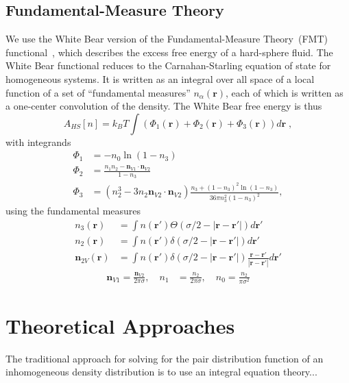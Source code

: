 \documentclass[letterpaper,twocolumn,amsmath,amssymb,pre,aps,10pt]{revtex4-1}
\newcommand{\rr}{\textbf{r}}
\begin{document}
\subsection*{Fundamental-Measure Theory}

We use the White Bear version of the Fundamental-Measure Theory~(FMT)
functional~\cite{roth2002whitebear}, which describes the excess free
energy of a hard-sphere fluid.  The White Bear functional reduces to
the Carnahan-Starling equation of state for homogeneous systems.  It
is written as an integral over all space of a local function of a set
of ``fundamental measures'' $n_\alpha(\rr)$, each of which is written
as a one-center convolution of the density.  The White Bear free
energy is thus
\begin{equation}
A_{\textit{HS}}[n] = k_B T \int \left(\Phi_1(\rr) + \Phi_2(\rr) + \Phi_3(\rr)\right) d\rr \; ,
\end{equation}
with integrands
\begin{align}
\Phi_1 &= -n_0 \ln\left( 1 - n_3\right) \label{eq:Phi1}\\
\Phi_2 &= \frac{n_1 n_2 - \mathbf{n}_{V1} \cdot\mathbf{n}_{V2}}{1-n_3} \\
\Phi_3 &= (n_2^3 - 3 n_2 \mathbf{n}_{V2} \cdot \mathbf{n}_{V2}) \frac{
  n_3 + (1-n_3)^2 \ln(1-n_3)
}{
  36\pi n_3^2\left( 1 - n_3 \right)^2
} , \label{eq:Phi3}
\end{align}
using the fundamental measures
\begin{align}
  n_3(\rr) &= \int n(\rr') \Theta(\sigma/2 -\left|\rr - \rr'\right|)
  d\rr' \label{eq:FMn3} \\
  n_2(\rr) &= \int n(\rr') \delta(\sigma/2 -\left|\rr - \rr'\right|) d\rr' \\
  \mathbf{n}_{2V}(\rr) &= \int n(\rr') \delta(\sigma/2 -\left|\rr - \rr'\right|) \frac{\rr-\rr'}{|\rr-\rr'|}d\rr'
\end{align}
\begin{align}
  \mathbf{n}_{V1} = \frac{\mathbf{n}_{V2}}{2\pi \sigma}, \quad
  n_1 &= \frac{n_2}{2\pi \sigma} , \quad
  n_0 = \frac{n_2}{\pi \sigma^2} \label{eq:FMrest}
\end{align}


\section{Theoretical Approaches}

The traditional approach for solving for the pair distribution
function of an inhomogeneous density distribution is to use an
integral equation theory...
\end{document}

